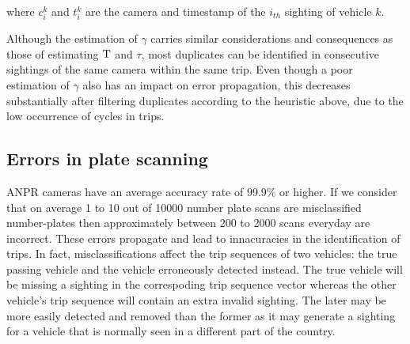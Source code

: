 where $c_i^k$ and $t_i^k$ are the camera and timestamp of the $i_{th}$ sighting of vehicle $k$.

 Although the estimation of $\gamma$ carries similar considerations and consequences as those of estimating $\mathrm{T}$ and $\tau$, most duplicates can be identified in consecutive sightings of the same camera within the same trip. Even though a poor estimation of $\gamma$ also has an impact on error propagation, this decreases substantially after filtering duplicates according to the heuristic above, due to the low occurrence of cycles in trips.

\subsection{Errors in plate scanning}\label{s.errors}

ANPR cameras have an average accuracy rate of 99.9\% or higher. If we consider that on average 1 to 10 out of 10000 number plate scans are misclassified number-plates then approximately between 200 to 2000 scans everyday are incorrect. These errors propagate and lead to innacuracies in the identification of trips. In fact, misclassifications affect the trip sequences of two vehicles: the true passing vehicle and the vehicle erroneously detected instead. The true vehicle will be missing a sighting in the correspoding trip sequence vector whereas the other vehicle's trip sequence will contain an extra invalid sighting. The later may be more easily detected and removed than the former as it may generate a sighting for a vehicle that is normally seen in a different part of the country.

